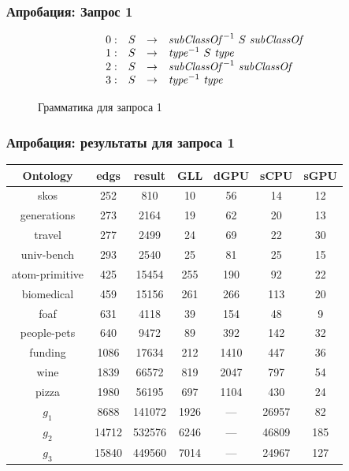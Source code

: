 \documentclass{beamer}
\begin{document}
\begin{frame}[fragile]
	\transwipe[direction=90]
	\frametitle{Апробация: Запрос 1}
\begin{figure}[h]
   \[
\begin{array}{rccl}
   0: & S & \rightarrow & \text{\textit{subClassOf}}^{-1} \ S \ \text{\textit{subClassOf}} \\ 
   1: & S & \rightarrow & \text{\textit{type}}^{-1} \ S \ \text{\textit{type}} \\ 
   2: & S & \rightarrow & \text{\textit{subClassOf}}^{-1} \ \text{\textit{subClassOf}} \\ 
   3: & S & \rightarrow & \text{\textit{type}}^{-1} \ \text{\textit{type}} \\ 
\end{array}
\]
\caption{Грамматика для запроса 1}
\label{ProductionRulesQuery1}
\end{figure}
\end{frame}

\begin{frame}[fragile]
  \transwipe[direction=90]
  \frametitle{Апробация: результаты для запроса 1}
\begin{center}
\begin{tabular}{ | c | c | c | c | c | c | c |}
\hline
Ontology & edgs & result & GLL & dGPU & sCPU & sGPU \\
\hline 
\hline
skos        & 252 & 810 & 10 & 56 & 14 & 12\\
generations & 273 & 2164 & 19 & 62 & 20 & 13\\
travel      & 277 & 2499 & 24 & 69 & 22 & 30\\
univ-bench  & 293 & 2540 & 25 & 81 & 25 & 15\\
atom-primitive & 425 & 15454 & 255 & 190 & 92 & 22\\
biomedical & 459 & 15156 & 261 & 266 & 113 & 20\\
foaf        & 631 & 4118 & 39 & 154 & 48 & 9\\
people-pets & 640 & 9472 & 89 & 392 & 142 & 32\\
funding     & 1086 & 17634 & 212 & 1410 & 447 & 36\\
wine        & 1839 & 66572 & 819 & 2047 & 797 & 54\\
pizza       & 1980 & 56195 & 697 & 1104 & 430 & 24\\
$g_{1}$     & 8688 & 141072 & 1926 & --- & 26957 & 82\\
$g_{2}$     & 14712 & 532576 & 6246 & --- & 46809 & 185\\
$g_{3}$     & 15840 & 449560 & 7014 & --- & 24967 & 127\\
\hline
\end{tabular}
\end{center}  
\end{frame}
\end{document}
